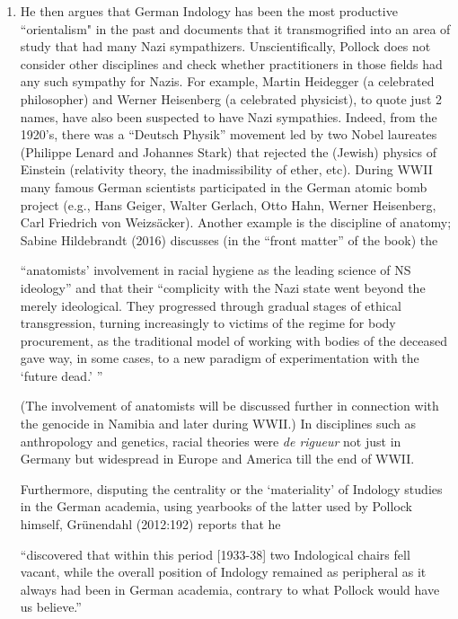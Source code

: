 {\begin{enumerate}
\item He then argues that German Indology has been the most productive “orientalism" in the past and documents that it transmogrified into an area of study that had many Nazi sympathizers. Unscientifically, Pollock does not consider other disciplines and check whether practitioners in those fields had any such sympathy for Nazis. For example, Martin Heidegger (a celebrated philosopher) and Werner Heisenberg (a celebrated physicist), to quote just 2 names, have also been suspected to have Nazi sympathies. Indeed, from the 1920’s, there was a “Deutsch Physik” movement led by two Nobel laureates (Philippe Lenard and Johannes Stark) that rejected the (Jewish) physics of Einstein (relativity theory, the inadmissibility of ether, etc). During WWII many famous German scientists participated in the German atomic bomb project (e.g., Hans Geiger, Walter Gerlach, Otto Hahn, Werner Heisenberg, Carl Friedrich von Weizsäcker). Another example is the discipline of anatomy; Sabine Hildebrandt (2016) discusses (in the “front matter” of the book) the 
\begin{myquote}
“anatomists’ involvement in racial hygiene as the leading science of NS ideology” and that their “complicity with the Nazi state went beyond the merely ideological. They progressed through gradual stages of ethical transgression, turning increasingly to victims of the regime for body procurement, as the traditional model of working with bodies of the deceased gave way, in some cases, to a new paradigm of experimentation with the ‘future dead.’ ”
\end{myquote}

(The involvement of anatomists will be discussed further in connection with the genocide in Namibia and later during WWII.) In disciplines such as anthropology and genetics, racial theories were {\sl de rigueur} not just in Germany but widespread in Europe and America till the end of WWII\@. 

Furthermore, disputing the centrality or the ‘materiality’ of Indology studies in the German academia, using yearbooks of the latter used by Pollock himself, Grünendahl (2012:192) reports that he

\begin{myquote}
“discovered that within this period [1933-38] two Indological chairs fell vacant, while the overall position of Indology remained as peripheral as it always had been in German academia, contrary to what Pollock would have us believe.”
\end{myquote}


\end{enumerate}}
